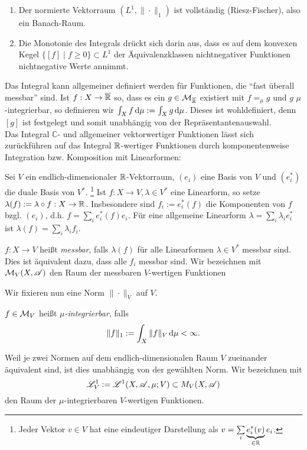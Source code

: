 \begin{remark}
\begin{enumerate}
\item Der normierte Vektorraum $(L^1,\|\cdot\|_1)$ ist vollständig (Riesz-Fischer), also ein Banach-Raum. %
\item Die Monotonie des Integrals drückt sich darin aus, dass es auf dem konvexen Kegel $\{[f]\mid f\geq 0\}\subset L^1$ der Äquivalenzklassen nichtnegativer Funktionen nichtnegative Werte annimmt.
\end{enumerate}
\end{remark}

Das Integral kann allgemeiner definiert werden für Funktionen, die ``fast überall messbar'' sind. Ist $f: X \to \overline{\mathbb{R}}$ so, dass es ein $g\in \mathcal{M}_{\overline{\mathbb{R}}}$ existiert mit $f=_\mu g$ und $g$ $\mu$-integrierbar, so definieren wir $\int_X f \, \mathrm{d} \mu := \int_X g \, \mathrm{d} \mu$. Dieses ist wohldefiniert, denn $[g]$ ist festgelegt und somit unabhängig von der Repräsentantenauswahl.\\

Das Integral $\mathbb{C}$- und allgemeiner vektorwertiger Funktionen lässt sich zurückführen auf das Integral $\mathbb{R}$-wertiger Funktionen durch komponentenweise Integration bzw. Komposition mit Linearformen: \vspace{0.3pc}

Sei $V$ ein endlich-dimensionaler $\mathbb{R}$-Vektorraum, $(e_i)$ eine Basis von $V$ und $(e_i^*)$ die duale Basis von $V^*$. \footnote{Jeder Vektor $v\in V$ hat eine eindeutiger Darstellung als $v= \sum\limits_i \underbrace{e_i^*(v)}_{\in\mathbb{R}}e_i$.} 
Ist $f:X \to V,\lambda\in V^*$ eine Linearform, so setze $\lambda(f):=\lambda \circ f :X \to \mathbb{R}$.  Insbesondere sind $f_i:=e_i^*(f)$ die Komponenten von $f$ bzgl. $(e_i)$, d.h. $f=\sum\limits_i e_i^*(f)e_i$. Für eine allgemeine Linearform $\lambda=\sum\limits_i \lambda_ie_i^*$ ist $\lambda(f)=\sum\limits_i \lambda_i f_i$.

\begin{definition}
\begin{mdframed}
$f:X\to V$ heißt \emph{messbar}, falls $\lambda(f)$ für alle Linearformen $\lambda\in V^*$ messbar sind. Dies ist äquivalent dazu, dass alle $f_i$ messbar sind. Wir bezeichnen mit $\mathcal{M}_V(X,\mathscr{A})$ den Raum der messbaren $V$-wertigen Funktionen
\end{mdframed}
\end{definition}
Wir fixieren nun eine Norm $\|\cdot\|_V$ auf $V$. 
\begin{definition}
\begin{mdframed}
$f\in \mathcal{M}_V$ heißt \emph{$\mu$-integrierbar}, falls
$$\|f\|_1 := \int_X \|f\|_V \, \mathrm{d} \mu <\infty.$$
\end{mdframed}
Weil je zwei Normen auf dem endlich-dimensionalen Raum $V$ zueinander äquivalent sind, ist dies unabhängig von der gewählten Norm. Wir bezeichnen mit $$\mathscr{L}^1_V:=\mathscr{L}^1(X,\mathscr{A},\mu;V)\subset{M_V(X,\mathscr{A})}$$  den Raum der $\mu$-integrierbaren $V$-wertigen Funktionen.
\end{definition}

